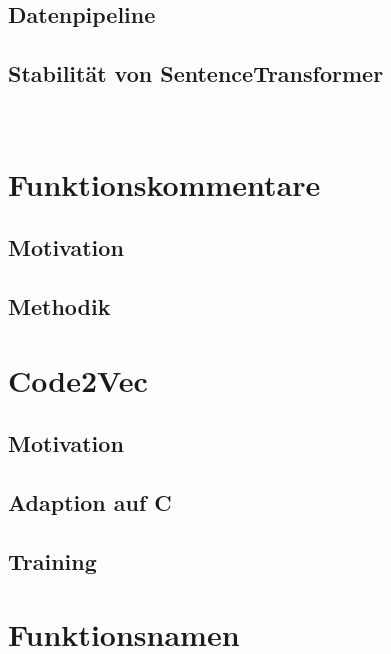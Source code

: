 \documentclass[12pt,letterpaper,ngerman]{article}
\begin{document}
\subsection{Datenpipeline}
\subsection{Stabilität von SentenceTransformer}

\
\section{Funktionskommentare}
\subsection{Motivation}
\subsection{Methodik} 
\section{Code2Vec}
\subsection{Motivation} 
\subsection{Adaption auf C} 
\subsection{Training}
\section{Funktionsnamen}
\end{document}
